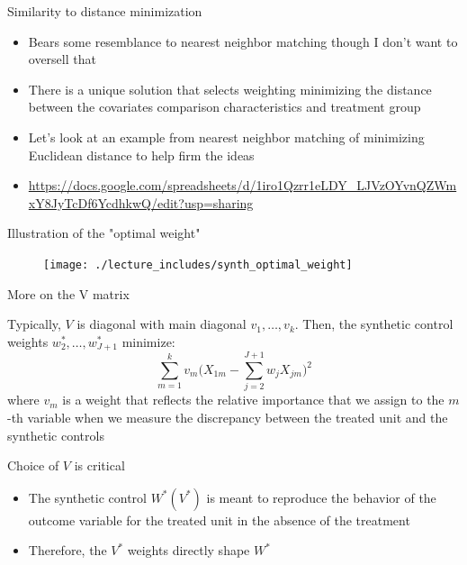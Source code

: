 \documentclass{beamer}
\begin{document}
\begin{frame}{Similarity to distance minimization}

\begin{itemize}
\item Bears some resemblance to nearest neighbor matching though I don't want to oversell that
\item There is a unique solution that selects weighting minimizing the distance between the covariates comparison characteristics and treatment group
\item Let's look at an example from nearest neighbor matching of minimizing Euclidean distance to help firm the ideas
\item \url{https://docs.google.com/spreadsheets/d/1iro1Qzrr1eLDY_LJVzOYvnQZWmxY8JyTcDf6YcdhkwQ/edit?usp=sharing}
\end{itemize}

\end{frame}

\begin{frame}{Illustration of the "optimal weight"}

\begin{figure}
\texttt{[image: ./lecture\_includes/synth\_optimal\_weight]}
\end{figure}

\end{frame}



\begin{frame}{More on the V matrix}

Typically, $V$ is diagonal with main diagonal $v_1, \dots, v_k$.  Then, the synthetic control weights $w_2^*, \dots, w_{J+1}^*$ minimize: $$\sum_{m=1}^k v_m \bigg(X_{1m} - \sum_{j=2}^{J+1}w_jX_{jm}\bigg)^2$$ where $v_m$ is a weight that reflects the relative importance that we assign to the $m$-th variable when we measure the discrepancy between the treated unit and the synthetic controls

\end{frame}

\begin{frame}{Choice of $V$ is critical}
	
		\begin{itemize}
		\item The synthetic control $W^*(V^*)$ is meant to reproduce the behavior of the outcome variable for the treated unit in the absence of the treatment
		\item Therefore, the $V^*$ weights directly shape $W^*$
		\end{itemize}
\end{frame}
\end{document}
